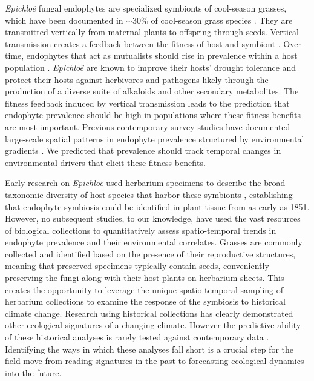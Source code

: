 \documentclass[11pt]{article}
\let\cite\citep
\begin{document}
\emph{Epichloë} fungal endophytes are specialized symbionts of cool-season grasses, which have been documented in $\sim 30$\% of cool-season grass species \citep{leuchtmann1992systematics}.
They are transmitted vertically from maternal plants to offspring through seeds.
Vertical transmission creates a feedback between the fitness of host and symbiont \citep{fine1975vectors, douglas1998host, rudgers2009fungus}. 
Over time, endophytes that act as mutualists should rise in prevalence within a host population \citep{donald2021context}. 
\emph{Epichloë} are known to improve their hosts' drought tolerance \cite{decunta2021systematic} and protect their hosts against herbivores \cite{crawford2010fungal} and pathogens \cite{xia2018role} likely through the production of a diverse suite of alkaloids and other secondary metabolites.
The fitness feedback induced by vertical transmission leads to the prediction that endophyte prevalence should be high in populations where these fitness benefits are most important. 
Previous contemporary survey studies have documented large-scale spatial patterns in  endophyte prevalence structured by environmental gradients \citep{granath2007variation,bazely2007broad, afkhami2012fungal,sneck2017variation}.
We predicted that prevalence should track temporal changes in environmental drivers that elicit these fitness benefits.

Early research on \emph{Epichloë} used herbarium specimens to describe the broad taxonomic diversity of host species that harbor these symbionts \citep{white1985endophyte}, establishing that endophyte symbiosis could be identified in plant tissue from as early as 1851.
However, no subsequent studies, to our knowledge, have used the vast resources of biological collections to quantitatively assess spatio-temporal trends in endophyte prevalence and their environmental correlates. 
Grasses are commonly collected and identified based on the presence of their reproductive structures, meaning that preserved specimens typically contain seeds, conveniently preserving the fungi along with their host plants on herbarium sheets. 
This creates the opportunity to leverage the unique spatio-temporal sampling of herbarium collections to examine the response of the symbiosis to historical climate change. 
Research using historical collections has clearly demonstrated other ecological signatures of a changing climate. 
However the predictive ability of these historical analyses is rarely tested against contemporary data \citep{lee2024phenological}. 
Identifying the ways in which these analyses fall short is a crucial step for the field move from reading signatures in the past to forecasting ecological dynamics into the future.
\end{document}
